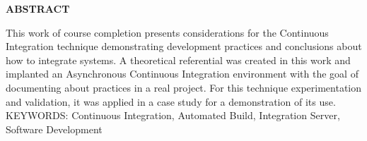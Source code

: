 \begin{center}
\textbf{ABSTRACT}
\end{center}

\singlespacing

\noindent This work of course completion presents considerations for the Continuous Integration technique demonstrating development practices and conclusions about how to integrate systems. A theoretical referential was created in this work and implanted an Asynchronous Continuous Integration environment with the goal of documenting about practices in a real project. For this technique experimentation and validation, it was applied in a case study for a demonstration of its use. \\

\noindent KEYWORDS: Continuous Integration, Automated Build, Integration Server, Software Development

